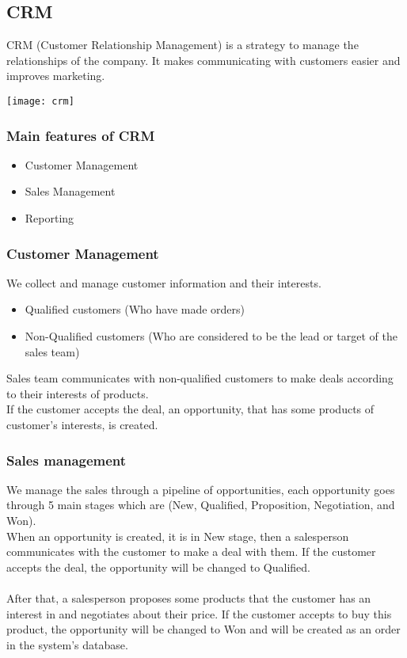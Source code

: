 \break
\subsection{CRM}
CRM (Customer Relationship Management) is a strategy to manage the relationships of the company.
It makes communicating with customers easier and improves marketing.
\begin{center}
    \texttt{[image: crm]}
\end{center}

\subsubsection{Main features of CRM}
\begin{itemize}
    \item Customer Management
    \item Sales Management
    \item Reporting
\end{itemize}
\subsubsection{Customer Management}
We collect and manage customer information and their interests.
\begin{itemize}
    \item Qualified customers (Who have made orders)
    \item Non-Qualified customers (Who are considered to be the lead or target of the sales team)
\end{itemize}
Sales team communicates with non-qualified customers to make deals according to their interests of
products.\\
If the customer accepts the deal, an opportunity, that has some products of customer’s interests, is
created.
\subsubsection{Sales management}
We manage the sales through a pipeline of opportunities, each opportunity goes through 5 main stages
which are (New, Qualified, Proposition, Negotiation, and Won).\\
When an opportunity is created, it is in New stage, then a salesperson communicates with the
customer to make a deal with them. If the customer accepts the deal, the opportunity will be changed
to Qualified.\\\\
After that, a salesperson proposes some products that the customer has an interest in and negotiates
about their price. If the customer accepts to buy this product, the opportunity will be changed to Won
and will be created as an order in the system’s database.
